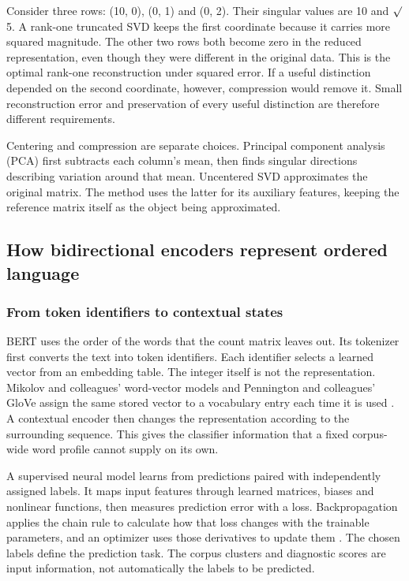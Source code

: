 \documentclass[10pt,letterpaper]{article}
\begin{document}
Consider three rows: (10, 0), (0, 1) and (0, 2). Their singular values are 10 and \ensuremath{\surd}5. A rank-one truncated SVD keeps the first coordinate because it carries more squared magnitude. The other two rows both become zero in the reduced representation, even though they were different in the original data. This is the optimal rank-one reconstruction under squared error. If a useful distinction depended on the second coordinate, however, compression would remove it. Small reconstruction error and preservation of every useful distinction are therefore different requirements.\par

Centering and compression are separate choices. Principal component analysis (PCA) first subtracts each column's mean, then finds singular directions describing variation around that mean. Uncentered SVD approximates the original matrix. The method uses the latter for its auxiliary features, keeping the reference matrix itself as the object being approximated.\par

\subsection{How bidirectional encoders represent ordered language}
\subsubsection{From token identifiers to contextual states}
BERT uses the order of the words that the count matrix leaves out. Its tokenizer first converts the text into token identifiers. Each identifier selects a learned vector from an embedding table. The integer itself is not the representation. Mikolov and colleagues' word-vector models and Pennington and colleagues' GloVe assign the same stored vector to a vocabulary entry each time it is used \cite{word2vec,glove}. A contextual encoder then changes the representation according to the surrounding sequence. This gives the classifier information that a fixed corpus-wide word profile cannot supply on its own.\par

A supervised neural model learns from predictions paired with independently assigned labels. It maps input features through learned matrices, biases and nonlinear functions, then measures prediction error with a loss. Backpropagation applies the chain rule to calculate how that loss changes with the trainable parameters, and an optimizer uses those derivatives to update them \cite{rumelhart}. The chosen labels define the prediction task. The corpus clusters and diagnostic scores are input information, not automatically the labels to be predicted.\par
\end{document}
